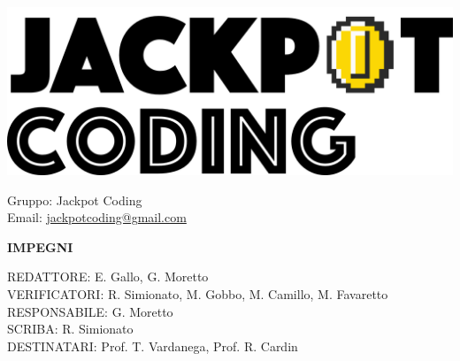 \documentclass[5pt]{article}
\begin{document}
\begin{minipage}[t]{0.50\textwidth}
    \begin{flushleft}
        \hspace{10pt}
        \includegraphics[scale=0.65]{jackpot-logo.png} 
    \end{flushleft}
\end{minipage}
\hspace{-60pt} %
\begin{flushright}
    \begin{minipage}[t]{0.50\textwidth}
        \begin{flushright}
            Gruppo: {\Large Jackpot Coding}\\
            Email: \href{mailto:jackpotcoding@gmail.com}{jackpotcoding@gmail.com}
        \end{flushright}
    \end{minipage}
\end{flushright}

\vspace{24pt}

\begin{center}
    \textbf{\Huge IMPEGNI}
\end{center}

\vspace{13pt}

\begin{flushleft}
    \begin{spacing}{1.5}
        REDATTORE: E. Gallo, G. Moretto \\%
        VERIFICATORI: R. Simionato, M. Gobbo, M. Camillo, M. Favaretto \\
        RESPONSABILE: G. Moretto\\%
        \vspace{7pt}
        SCRIBA: R. Simionato\\%
        \vspace{7pt}
        DESTINATARI: Prof. T. Vardanega, Prof. R. Cardin\\%
    \end{spacing}
\end{flushleft}
\end{document}
